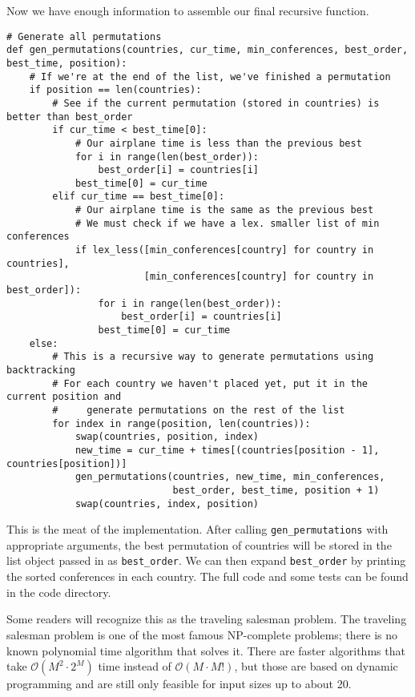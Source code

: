 Now we have enough information to assemble our final recursive function.

\begin{verbatim}
# Generate all permutations
def gen_permutations(countries, cur_time, min_conferences, best_order, best_time, position):
    # If we're at the end of the list, we've finished a permutation
    if position == len(countries):
        # See if the current permutation (stored in countries) is better than best_order
        if cur_time < best_time[0]:
            # Our airplane time is less than the previous best
            for i in range(len(best_order)):
                best_order[i] = countries[i]
            best_time[0] = cur_time
        elif cur_time == best_time[0]:
            # Our airplane time is the same as the previous best
            # We must check if we have a lex. smaller list of min conferences
            if lex_less([min_conferences[country] for country in countries],
                        [min_conferences[country] for country in best_order]):
                for i in range(len(best_order)):
                    best_order[i] = countries[i]
                best_time[0] = cur_time
    else:
        # This is a recursive way to generate permutations using backtracking
        # For each country we haven't placed yet, put it in the current position and
        #     generate permutations on the rest of the list
        for index in range(position, len(countries)):
            swap(countries, position, index)
            new_time = cur_time + times[(countries[position - 1], countries[position])]
            gen_permutations(countries, new_time, min_conferences,
                             best_order, best_time, position + 1)
            swap(countries, index, position)
\end{verbatim}

This is the meat of the implementation. After calling \texttt{gen_permutations} with appropriate arguments, the best permutation of countries will be stored in the list object passed in as \texttt{best_order}. We can then expand \texttt{best_order} by printing the sorted conferences in each country. The full code and some tests can be found in the code directory.

Some readers will recognize this as the traveling salesman problem. The traveling salesman problem is one of the most famous NP-complete problems; there is no known polynomial time algorithm that solves it. There are faster algorithms that take $\mathcal{O}(M^2 \cdot 2^M)$ time instead of $\mathcal{O}(M \cdot M!)$, but those are based on dynamic programming and are still only feasible for input sizes up to about 20.

